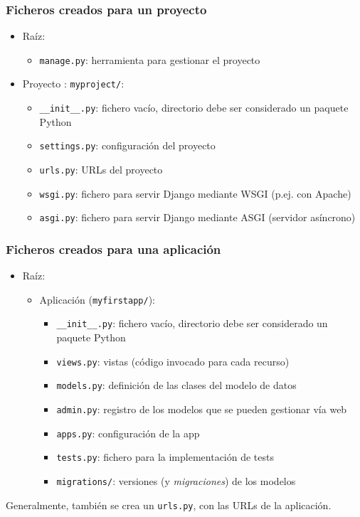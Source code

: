 \begin{frame}[fragile]
\frametitle{Ficheros creados para un proyecto}

\begin{itemize}
  \item Raíz:
  \begin{itemize}
    \item \verb|manage.py|: herramienta para gestionar el proyecto
  \end{itemize}
  \item Proyecto : \verb|myproject/|:
  \begin{itemize}
    \item \verb|__init__.py|: fichero vacío, directorio debe ser considerado un paquete Python
    \item \verb|settings.py|: configuración del proyecto
    \item \verb|urls.py|: URLs del proyecto
    \item \verb|wsgi.py|: fichero para servir Django mediante WSGI (p.ej. con Apache)
    \item \verb|asgi.py|: fichero para servir Django mediante ASGI (servidor asíncrono)
  \end{itemize}
\end{itemize}

\end{frame}

\begin{frame}[fragile]
\frametitle{Ficheros creados para una aplicación}


\begin{itemize}
\item Raíz:
  \begin{itemize}
  \item Aplicación (\verb|myfirstapp/|):
    \begin{itemize}
      \item \verb|__init__.py|: fichero vacío, directorio debe ser considerado un paquete Python
      \item \verb|views.py|: vistas (código invocado para cada recurso)
       \item \verb|models.py|: definición de las clases del modelo de datos
       \item \verb|admin.py|: registro de los modelos que se pueden gestionar vía web
       \item \verb|apps.py|: configuración de la app
       \item \verb|tests.py|: fichero para la implementación de tests
       \item \verb|migrations/|: versiones (y \emph{migraciones}) de los modelos
    \end{itemize}
  \end{itemize}
\end{itemize}

Generalmente, también se crea un \verb|urls.py|, con las URLs de la aplicación.

\end{frame}

